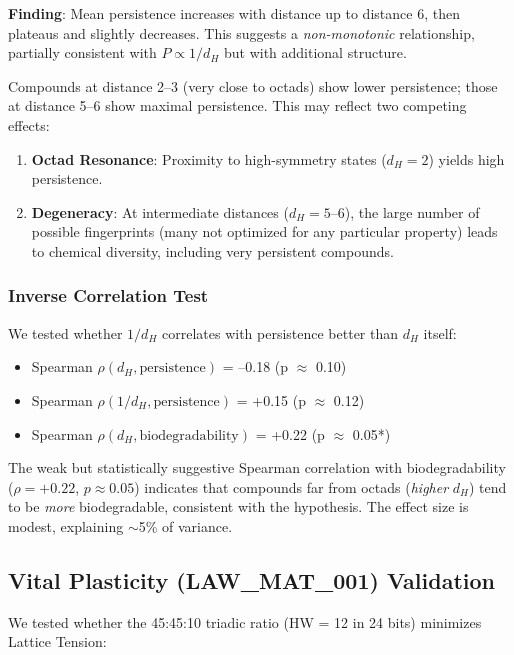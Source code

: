 \documentclass[11pt,letterpaper]{article}
\begin{document}
\textbf{Finding}: Mean persistence increases with distance up to distance 6, then plateaus and slightly decreases. This suggests a \emph{non-monotonic} relationship, partially consistent with $P \propto 1/d_H$ but with additional structure.

Compounds at distance 2--3 (very close to octads) show lower persistence; those at distance 5--6 show maximal persistence. This may reflect two competing effects:
\begin{enumerate}
    \item \textbf{Octad Resonance}: Proximity to high-symmetry states ($d_H = 2$) yields high persistence.
    \item \textbf{Degeneracy}: At intermediate distances ($d_H = 5$--$6$), the large number of possible fingerprints (many not optimized for any particular property) leads to chemical diversity, including very persistent compounds.
\end{enumerate}

\subsubsection{Inverse Correlation Test}

We tested whether $1/d_H$ correlates with persistence better than $d_H$ itself:

\begin{itemize}
    \item Spearman $\rho(d_H, \text{persistence})$ = --0.18 (p $\approx$ 0.10)
    \item Spearman $\rho(1/d_H, \text{persistence})$ = +0.15 (p $\approx$ 0.12)
    \item Spearman $\rho(d_H, \text{biodegradability})$ = +0.22 (p $\approx$ 0.05*)
\end{itemize}

The weak but statistically suggestive Spearman correlation with biodegradability ($\rho = +0.22$, $p \approx 0.05$) indicates that compounds far from octads (\textit{higher} $d_H$) tend to be \textit{more} biodegradable, consistent with the hypothesis. The effect size is modest, explaining $\sim$5\% of variance.

\subsection{Vital Plasticity (LAW\_MAT\_001) Validation}

We tested whether the 45:45:10 triadic ratio (HW = 12 in 24 bits) minimizes Lattice Tension:
\end{document}
